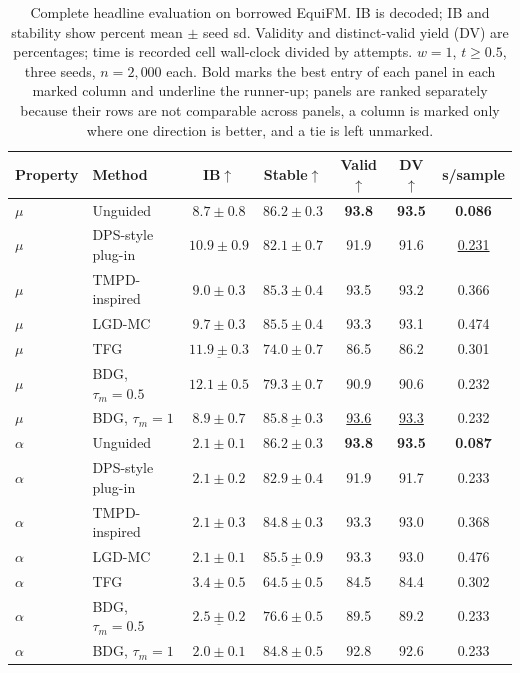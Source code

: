 \documentclass{article}
\begin{document}
\begin{table}[!htbp]
\centering\small
\caption{Complete headline evaluation on borrowed EquiFM. IB is decoded; IB and stability show percent mean $\pm$ seed sd. Validity and distinct-valid yield (DV) are percentages; time is recorded cell wall-clock divided by attempts. $w=1$, $t\ge0.5$, three seeds, $n=2{,}000$ each. Bold marks the best entry of each panel in each marked column and underline the runner-up; panels are ranked separately because their rows are not comparable across panels, a column is marked only where one direction is better, and a tie is left unmarked.}
\label{tab:full-equifm}
\begin{tabular}{llccccc}
\toprule
Property & Method & IB$\uparrow$ & Stable$\uparrow$ & Valid$\uparrow$ & DV$\uparrow$ & s/sample\\
\midrule
$\mu$ & Unguided & $8.7\pm0.8$ & $\mathbf{86.2\pm0.3}$& \textbf{93.8}& \textbf{93.5}& \textbf{0.086}\\
$\mu$ & DPS-style plug-in & $10.9\pm0.9$ & $82.1\pm0.7$ & 91.9 & 91.6 & \underline{0.231}\\
$\mu$ & TMPD-inspired & $9.0\pm0.3$ & $85.3\pm0.4$ & 93.5 & 93.2 & 0.366\\
$\mu$ & LGD-MC & $9.7\pm0.3$ & $85.5\pm0.4$ & 93.3 & 93.1 & 0.474\\
$\mu$ & TFG & $\underline{11.9\pm0.3}$& $74.0\pm0.7$ & 86.5 & 86.2 & 0.301\\
$\mu$ & BDG, $\tau_m=0.5$ & $\mathbf{12.1\pm0.5}$& $79.3\pm0.7$ & 90.9 & 90.6 & 0.232\\
$\mu$ & BDG, $\tau_m=1$ & $8.9\pm0.7$ & $\underline{85.8\pm0.3}$& \underline{93.6}& \underline{93.3}& 0.232\\
\midrule
$\alpha$ & Unguided & $2.1\pm0.1$ & $\mathbf{86.2\pm0.3}$& \textbf{93.8}& \textbf{93.5}& \textbf{0.087}\\
$\alpha$ & DPS-style plug-in & $2.1\pm0.2$ & $82.9\pm0.4$ & 91.9 & 91.7 & 0.233\\
$\alpha$ & TMPD-inspired & $2.1\pm0.3$ & $84.8\pm0.3$ & 93.3 & 93.0 & 0.368\\
$\alpha$ & LGD-MC & $2.1\pm0.1$ & $\underline{85.5\pm0.9}$& 93.3 & 93.0 & 0.476\\
$\alpha$ & TFG & $\mathbf{3.4\pm0.5}$& $64.5\pm0.5$ & 84.5 & 84.4 & 0.302\\
$\alpha$ & BDG, $\tau_m=0.5$ & $\underline{2.5\pm0.2}$& $76.6\pm0.5$ & 89.5 & 89.2 & 0.233\\
$\alpha$ & BDG, $\tau_m=1$ & $2.0\pm0.1$ & $84.8\pm0.5$ & 92.8 & 92.6 & 0.233\\

\end{tabular}
\end{table}
\end{document}
